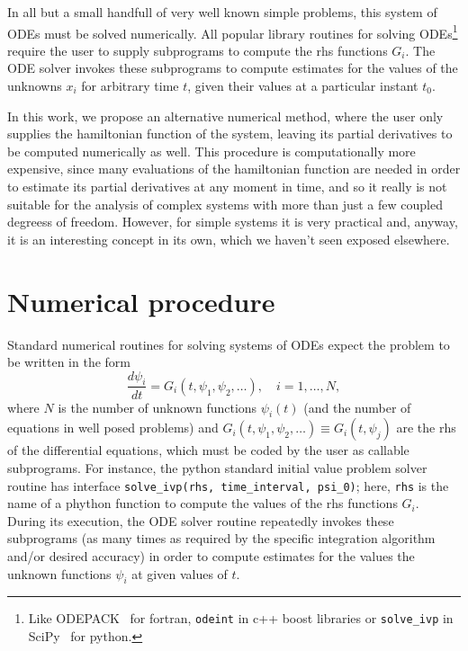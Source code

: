 \documentclass{iopart}
\begin{document}
In all but a small handfull of very well known simple problems, this system of
ODEs must be solved numerically. All popular library routines for solving
ODEs\footnote{Like ODEPACK~\cite{odepack} for fortran, \texttt{odeint}
  \cite{odeint} in c++ boost libraries or 
  \texttt{solve\_ivp} in SciPy~\cite{scipy} for python.}
require the user to supply subprograms to compute the rhs functions $G_i$.
The ODE solver invokes these subprograms to compute estimates for the
values of the unknowns $x_i$ for arbitrary time $t$, given their values at a
particular instant $t_0$.

In this work, we propose an alternative numerical method, where the user only
supplies the hamiltonian function of the system, leaving its partial derivatives
to be computed numerically as well.  This procedure is computationally more
expensive, since many evaluations of the hamiltonian function are needed in
order to estimate its partial derivatives at any moment in time, and so it
really is not suitable for the analysis of complex systems with more than just a
few coupled degreess of freedom. However, for simple systems it is very
practical and, anyway, it is an interesting concept in its own, which we haven't
seen exposed elsewhere.

\section{Numerical procedure}
Standard numerical routines for solving systems of ODEs expect the problem to be
written in the form
\begin{equation}\label{eq:numheqs}
  \frac{d\psi_i}{dt}=G_i(t, \psi_1, \psi_2, \ldots),\quad i=1, \ldots, N,
\end{equation}
where $N$ is the number of unknown functions $\psi_i(t)$ (and the number of
equations in well posed problems) and $G_i(t, \psi_1, \psi_2, \ldots)\equiv
G_i(t,\psi_j)$ are the rhs of the differential equations, which must be coded by
the user as callable subprograms. For instance, the python standard initial
value problem solver routine has interface
\texttt{solve\_ivp(rhs, time\_interval, psi\_0)}; here, \texttt{rhs} is the name
of a phython function to compute the values of the rhs functions $G_i$.
During its execution, the ODE solver routine repeatedly invokes these
subprograms (as many times as required by the specific integration algorithm
and/or desired accuracy) in order to compute estimates for the values the
unknown functions $\psi_i$ at given values of $t$.
\end{document}
